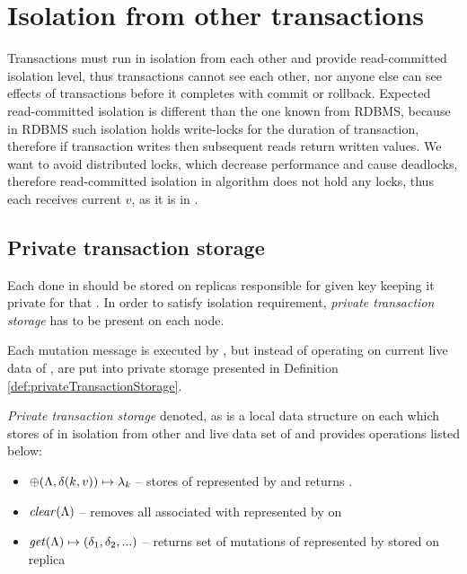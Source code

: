 
\section{Isolation from other transactions}
Transactions must run in isolation from each other and provide read-committed isolation level, thus transactions cannot see each other, nor anyone else can see effects of transactions before it completes with commit or rollback. Expected read-committed isolation is different than the one known from RDBMS, because in RDBMS such isolation holds write-locks for the duration of transaction, therefore if transaction writes then subsequent reads return written values. We want to avoid distributed locks, which decrease performance and cause deadlocks, therefore read-committed isolation in \mpt algorithm does not hold any locks, thus each \selectMessage receives current $v$, as it is in \database.

\subsection{Private transaction storage}
\label{sec:mpp:privateTxStorage}
Each  done in \transaction should be stored on replicas responsible for given key keeping it private for that \transaction. In order to satisfy isolation requirement, \emph{private transaction storage} has to be present on each node.

Each mutation message is executed by , but instead of operating on current live data of \database, \mutations are put into private storage presented in Definition \ref{def:privateTransactionStorage}. 

\begin{definition}
\label{def:privateTransactionStorage}
\emph{Private transaction storage} denoted, as \txStorage is a local data structure on each  which stores \mutations of \transaction in isolation from other \transactions and live data set of \database and provides operations listed below: 
  \begin{itemize}
    \item $\oplus(\text{$\Lambda$}, \text{$\delta(k, v)$}) \mapsto \text{$\lambda_{k}$}$ -- stores  of \transactionj represented by \txState and returns . 
    \item $\mathit{clear}(\text{$\Lambda$})$ -- removes all \mutations associated with \transactionj represented by \txState on 
    \item $\mathit{get}(\text{$\Lambda$}) \mapsto \text{$(\delta_{1}, \delta_{2}, ...)$}$ -- returns set of mutations of  \transactionj represented by \txState stored on replica  
  \end{itemize}
\end{definition}

